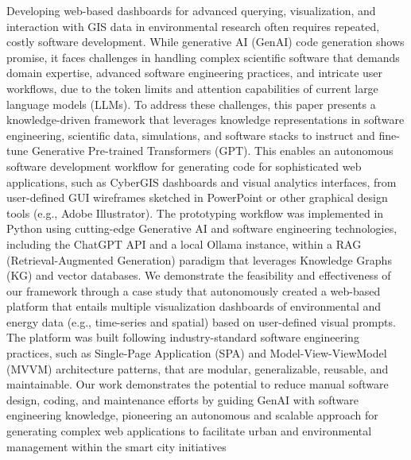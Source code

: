 
Developing web-based dashboards for advanced querying, visualization, and interaction with GIS data in environmental research often requires repeated, costly software development. While generative AI (GenAI) code generation shows promise, it faces challenges in handling complex scientific software that demands domain expertise, advanced software engineering practices, and intricate user workflows, due to the token limits and attention capabilities of current large language models (LLMs). To address these challenges, this paper presents a knowledge-driven framework that leverages knowledge representations in software engineering, scientific data, simulations, and software stacks to instruct and fine-tune Generative Pre-trained Transformers (GPT). This enables an autonomous software development workflow for generating code for sophisticated web applications, such as CyberGIS dashboards and visual analytics interfaces, from user-defined GUI wireframes sketched in PowerPoint or other graphical design tools (e.g., Adobe Illustrator). The prototyping workflow was implemented in Python using cutting-edge Generative AI and software engineering technologies, including the ChatGPT API and a local Ollama instance, within a RAG (Retrieval-Augmented Generation) paradigm that leverages Knowledge Graphs (KG) and vector databases. We demonstrate the feasibility and effectiveness of our framework through a case study that autonomously created a web-based platform that entails multiple visualization dashboards of environmental and energy data (e.g., time-series and spatial) based on user-defined visual prompts. The platform was built following industry-standard software engineering practices, such as Single-Page Application (SPA) and Model-View-ViewModel (MVVM) architecture patterns, that are modular, generalizable, reusable, and maintainable. Our work demonstrates the potential to reduce manual software design, coding, and maintenance efforts by guiding GenAI with software engineering knowledge, pioneering an autonomous and scalable approach for generating complex web applications to facilitate urban and environmental management within the smart city initiatives

